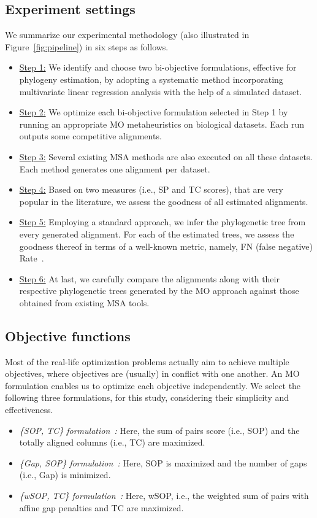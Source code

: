\begin{figure}[!htbp]
\end{figure}

\subsection{Experiment settings}
\label{sec:exp_settings}
We summarize our experimental methodology (also illustrated in Figure~\ref{fig:pipeline}) in six steps as follows.
\begin{itemize}
	\item \underline{Step 1:} We identify and choose two bi-objective formulations, effective for phylogeny estimation, by adopting a systematic method incorporating multivariate linear regression analysis with the help of a simulated dataset. \item \underline{Step 2:} We optimize each bi-objective formulation selected in Step 1 by
	 running an appropriate MO metaheuristics on biological datasets. Each run outputs some competitive alignments. 
	\item \underline{Step 3:} Several existing MSA methods are also executed on all these datasets. Each method generates one alignment per dataset.
\item \underline{Step 4:} Based on two measures (i.e., SP and TC scores), that are very popular in the literature, we assess the goodness of all estimated alignments. \item \underline{Step 5:} Employing a standard approach, we infer the phylogenetic tree from every generated alignment. For each of the estimated trees, we assess the goodness thereof in terms of a well-known metric, namely, FN (false negative) Rate~\citep{warnow2017computational}.
	\item \underline{Step 6:} At last, we carefully compare the alignments along with their respective phylogenetic trees generated by the MO approach against those obtained from existing MSA tools. \end{itemize}
\subsection{Objective functions}
\label{sec:formulation}
Most of the real-life optimization problems actually aim to achieve multiple objectives, where objectives are (usually) in conflict with one another. An MO formulation enables us to optimize each objective independently. We select the following three formulations, for this study, considering their simplicity and effectiveness. \begin{itemize}
	\item \textit{\{SOP, TC\} formulation~\citep{da2010alineaga}:} Here, the sum of pairs score (i.e., SOP) and the totally aligned columns (i.e., TC) are maximized. 

	\item \textit{\{Gap, SOP\} formulation~\citep{abbasi2015local}:} Here, SOP is maximized and the number of gaps (i.e., Gap) is minimized.
	
	\item \textit{\{wSOP, TC\} formulation~\citep{rubio2016hybrid}:} Here, wSOP, i.e., the weighted sum of pairs with affine gap penalties and TC are maximized.
\end{itemize}


